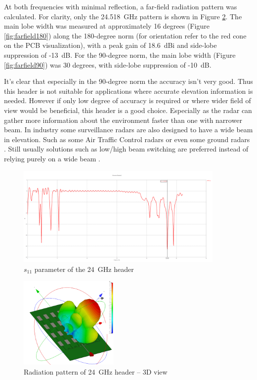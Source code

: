 At both frequencies with minimal reflection, a far-field radiation pattern was calculated.
For clarity, only the 24.518~GHz pattern is shown in Figure \ref{fig:farfield3d}.
The main lobe width was measured at approximately 16 degrees (Figure \ref{fig:farfield180}) along the 180-degree norm (for orientation refer to the red cone on the PCB visualization), with a peak gain of 18.6~dBi and side-lobe suppression of -13~dB.
For the 90-degree norm, the main lobe width (Figure \ref{fig:farfield90}) was 30 degrees, with side-lobe suppression of -10~dB.

It's clear that especially in the 90-degree norm the accuracy isn't very good.
Thus this header is not suitable for applications where accurate elevation information is needed.
However if only low degree of accuracy is required or where wider field of view would be beneficial, this header is a good choice.
Especially as the radar can gather more information about the environment faster than one with narrower beam.
In industry some surveillance radars are also designed to have a wide beam in elevation.
Such as some Air Traffic Control radars \cite{kratos} or even some ground radars \cite{blighter}.
Still usually solutions such as low/high beam switching are preferred instead of relying purely on a wide beam \cite{wolfBeam}.

\begin{figure}[h!]
  \centering
  \includegraphics[width=0.9\textwidth]{../img/s11.png}
  \caption[$s_{11}$ parameter of the 24~GHz header]{$s_{11}$ parameter of the 24~GHz header}
  \label{fig:s11}
\end{figure}


\begin{figure}[h!]
  \centering
  \includegraphics[width=0.43\textwidth]{../img/farfield3d.png}
  \caption[Radiation pattern of 24~GHz header -- 3D view]{Radiation pattern of 24~GHz header -- 3D view}
  \label{fig:farfield3d}
\end{figure}


